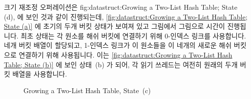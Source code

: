 크기 재조정 오퍼레이션은
{fig:datastruct:Growing a Two-List Hash Table; State (d)},
에 보인 것과 같이 진행되는데,
\cref{fig:datastruct:Growing a Two-List Hash Table; State (a)}
에 초기의 두개 버킷 상태가 보여져 있고 그림에서 그림으로 시간이 진행됩니다.
최초 상태는 각 원소를 해쉬 버킷에 연결하기 위해 0-인덱스 링크를 사용합니다.
네개 버킷 배열이 할당되고, 1-인덱스 링크가 이 원소들을 이 네개의 새로운 해쉬
버킷으로 연결하기 위해 사용됩니다.
이는
\cref{fig:datastruct:Growing a Two-List Hash Table; State (b)}
에 보인 상태~(b) 가 되어, 각 읽기 쓰레드는 여전히 원래의 두개 버킷 배열을
사용합니다.

\begin{figure}[tb]
\centering
{}
\caption{Growing a Two-List Hash Table, State~(c)}
\label{fig:datastruct:Growing a Two-List Hash Table; State (c)}
\end{figure}

